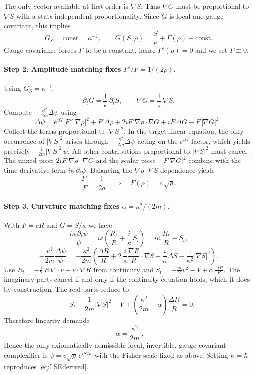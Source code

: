 \documentclass[11pt,a4paper]{article}
\numberwithin{equation}{section}
\theoremstyle{thmcompact}
\theoremstyle{remark}
\begin{document}
The only vector available at first order is $\nabla S$.
Thus $\nabla G$ must be proportional to $\nabla S$ with a state-independent proportionality. Since $G$ is local and gauge-covariant, this implies
\[
G_S=\text{const}=\kappa^{-1},\qquad
G(S,\rho)=\frac{S}{\kappa}+\Gamma(\rho)+\text{const}.
\]
Gauge covariance forces $\Gamma$ to be a constant, hence $\Gamma'(\rho)=0$ and we set $\Gamma\equiv0$.

\paragraph{Step 2. Amplitude matching fixes $F'/F=1/(2\rho)$.}
Using $G_S=\kappa^{-1}$,
\[
\partial_t G=\frac{1}{\kappa}\,\partial_t S,\qquad
\nabla G=\frac{1}{\kappa}\,\nabla S.
\]
Compute $-\,\frac{\kappa^2}{2m}\Delta\psi$ using
\[
\Delta\psi=e^{iG}\Big[
F''|\nabla\rho|^2+F'\Delta\rho
+2iF'\nabla\rho\!\cdot\!\nabla G
+iF\,\Delta G
-F\,|\nabla G|^2
\Big].
\]
Collect the terms proportional to $|\nabla S|^2$.
In the target linear equation, the only occurrence of $|\nabla S|^2$ arises through $-\,\frac{\kappa^2}{2m}\Delta\psi$ acting on the $e^{iG}$ factor, which yields precisely $-\frac{1}{2m}|\nabla S|^2\,\psi$.
All other contributions proportional to $|\nabla S|^2$ must cancel.
The mixed piece $2iF'\nabla\rho\!\cdot\!\nabla G$ and the scalar piece $-F|\nabla G|^2$ combine with the time derivative term $i\kappa\,\partial_t\psi$.
Balancing the $\nabla\rho\cdot\nabla S$ dependence yields
\[
\frac{F'}{F}=\frac{1}{2\rho}\quad\Rightarrow\quad
F(\rho)=c\,\sqrt{\rho}.
\]

\paragraph{Step 3. Curvature matching fixes $\alpha=\kappa^2/(2m)$.}
With $F=cR$ and $G=S/\kappa$ we have
\[
\frac{i\kappa\,\partial_t\psi}{\psi}
= i\kappa\left(\frac{R_t}{R}+\frac{i}{\kappa}\,S_t\right)
= i\kappa\,\frac{R_t}{R}-S_t,
\]
\[
-\frac{\kappa^2}{2m}\frac{\Delta\psi}{\psi}
= -\frac{\kappa^2}{2m}\left(\frac{\Delta R}{R}
+2\,\frac{i}{\kappa}\frac{\nabla R}{R}\!\cdot\!\nabla S
+\frac{i}{\kappa}\Delta S
-\frac{1}{\kappa^2}|\nabla S|^2\right).
\]
Use $R_t=-\frac{1}{2}\,R\,\nabla\!\cdot v - v\!\cdot\nabla R$ from continuity and $S_t= -\frac{m}{2}v^2 - V + \alpha\,\frac{\Delta R}{R}$.
The imaginary parts cancel if and only if the continuity equation holds, which it does by construction.
The real parts reduce to
\[
-\,S_t - \frac{1}{2m}|\nabla S|^2 - V
+\left(\frac{\kappa^2}{2m}-\alpha\right)\frac{\Delta R}{R}=0.
\]
Therefore linearity demands
\[
\boxed{\ \alpha=\frac{\kappa^2}{2m}\ }.
\]
Hence the only axiomatically admissible local, invertible, gauge-covariant complexifier is
$\psi=c\sqrt{\rho}\,e^{iS/\kappa}$ with the Fisher scale fixed as above.
Setting $\kappa=\hbar$ reproduces \eqref{eq:LSEderived}.
\end{document}
